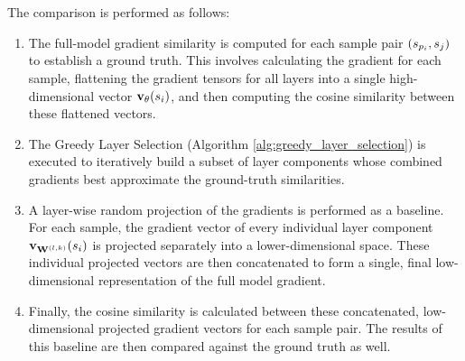 \\\\
The comparison is performed as follows:
\begin{enumerate}
    \item The {full-model gradient similarity} is computed for each sample pair $(\spi, \sj)$ to establish a ground truth. This involves calculating the gradient for each sample, flattening the gradient tensors for all layers into a single high-dimensional vector $\vXsi[\theta]$, and then computing the cosine similarity between these flattened vectors.
    \item The Greedy Layer Selection (Algorithm \ref{alg:greedy_layer_selection}) is executed to iteratively build a subset of layer components whose combined gradients best approximate the ground-truth similarities.
    \item A layer-wise random projection of the gradients is performed as a baseline. For each sample, the gradient vector of every individual layer component $\vXsi[\Wlk]$ is projected separately into a lower-dimensional space. These individual projected vectors are then concatenated to form a single, final low-dimensional representation of the full model gradient.
    \item Finally, the cosine similarity is calculated between these concatenated, low-dimensional projected gradient vectors for each sample pair. The results of this baseline are then compared against the ground truth as well. 
\end{enumerate}

